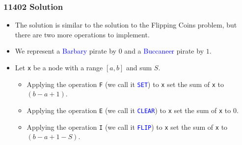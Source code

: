 \documentclass{beamer}
\begin{document}
\begin{frame}%
\frametitle{11402 Solution}

\begin{itemize}

\item The solution is similar to the solution to the Flipping Coins problem, but there are two more
operations to implement.

\vspace{0.2cm}

\item<2-> We represent a \textcolor{blue}{Barbary} pirate by $0$ and a \textcolor{blue}{Buccaneer} pirate by $1$.

\vspace{0.2cm}

\item<3-> Let \texttt{x} be a node with a range $[a,b]$ and sum $S$.
\begin{itemize}

\item<4-> Applying the operation \texttt{F} (we call it \textcolor{blue}{\texttt{SET}}) to \texttt{x} set the sum of \texttt{x} to $(b - a + 1)$.

\vspace{0.08cm}

\item<5-> Applying the operation \texttt{E} (we call it \textcolor{blue}{\texttt{CLEAR}}) to \texttt{x} set the sum of \texttt{x} to $0$.

\vspace{0.08cm}

\item<6-> Applying the operation \texttt{I} (we call it \textcolor{blue}{\texttt{FLIP}}) to \texttt{x} set the sum of \texttt{x} to $(b - a + 1 - S)$.

\end{itemize}

\end{itemize}

\end{frame}
\end{document}
